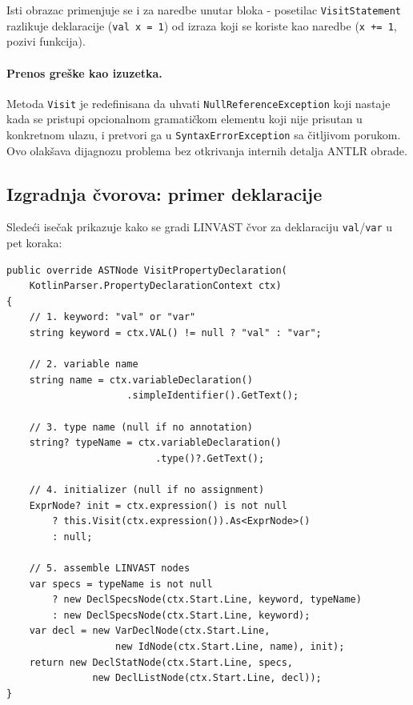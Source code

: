 \documentclass[a4paper]{article}
\begin{document}
\vspace{5px}
\noindent
Isti obrazac primenjuje se i za naredbe unutar bloka - posetilac
\texttt{VisitStatement} razlikuje deklaracije (\texttt{val x = 1}) od izraza
koji se koriste kao naredbe (\texttt{x += 1}, pozivi funkcija).

\paragraph{Prenos greške kao izuzetka.}
Metoda \texttt{Visit} je redefinisana da uhvati \texttt{NullReferenceException}
koji nastaje kada se pristupi opcionalnom gramatičkom elementu koji nije
prisutan u konkretnom ulazu, i pretvori ga u \texttt{SyntaxErrorException}
sa čitljivom porukom. Ovo olakšava dijagnozu problema bez otkrivanja internih
detalja ANTLR obrade.

\newpage
\subsection{Izgradnja čvorova: primer deklaracije}

Sledeći isečak prikazuje kako se gradi LINVAST čvor za deklaraciju
\texttt{val}/\texttt{var} u pet koraka:

\begin{lstlisting}[language=CSharp, caption={Posetilac za deklaraciju svojstva}]
public override ASTNode VisitPropertyDeclaration(
    KotlinParser.PropertyDeclarationContext ctx)
{
    // 1. keyword: "val" or "var"
    string keyword = ctx.VAL() != null ? "val" : "var";

    // 2. variable name
    string name = ctx.variableDeclaration()
                     .simpleIdentifier().GetText();

    // 3. type name (null if no annotation)
    string? typeName = ctx.variableDeclaration()
                          .type()?.GetText();

    // 4. initializer (null if no assignment)
    ExprNode? init = ctx.expression() is not null
        ? this.Visit(ctx.expression()).As<ExprNode>()
        : null;

    // 5. assemble LINVAST nodes
    var specs = typeName is not null
        ? new DeclSpecsNode(ctx.Start.Line, keyword, typeName)
        : new DeclSpecsNode(ctx.Start.Line, keyword);
    var decl = new VarDeclNode(ctx.Start.Line,
                   new IdNode(ctx.Start.Line, name), init);
    return new DeclStatNode(ctx.Start.Line, specs,
               new DeclListNode(ctx.Start.Line, decl));
}
\end{lstlisting}
\end{document}
